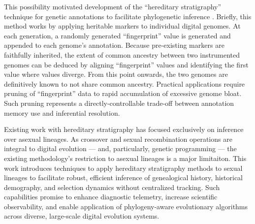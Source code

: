 This possibility motivated development of the ``hereditary stratigraphy'' technique for genetic annotations to facilitate phylogenetic inference \citep{moreno2022hereditary}.
Briefly, this method works by applying heritable markers to individual digital genomes.
At each generation, a randomly generated ``fingerprint'' value is generated and appended to each genome's annotation.
Because pre-existing markers are faithfully inherited, the extent of common ancestry between two instrumented genomes can be deduced by aligning ``fingerprint'' values and identifying the first value where values diverge.
From this point onwards, the two genomes are definitively known to not share common ancestry.
Practical applications require pruning of ``fingerprint'' data to rapid accumulation of excessive genome bloat.
Such pruning represents a directly-controllable trade-off between annotation memory use and inferential resolution.

Existing work with hereditary stratigraphy has focused exclusively on inference over asexual lineages.
As crossover and sexual recombination operations are integral to digital evolution --- and, particularly, genetic programming --- the existing methodology's restriction to asexual lineages is a major limitaiton.
This work introduces techniques to apply hereditary stratigraphy methods to sexual lineages to facilitate robust, efficient inference of genealogical history, historical demography, and selection dynamics without centralized tracking.
Such capabilities promise to enhance diagnostic telemetry, increase scientific observability, and enable application of phylogeny-aware evolutionary algorithms across diverse, large-scale digital evolution systems.





